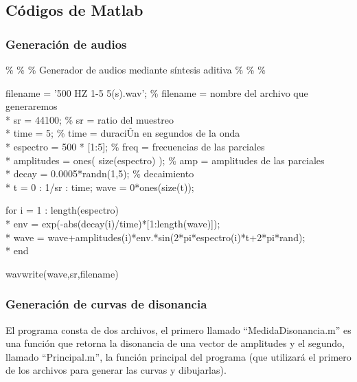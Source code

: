 \documentclass[11pt,a4paper]{article}
\begin{document}
\newpage

\subsection{Códigos de Matlab}

\subsubsection{Generación de audios}

\%                                                         \%
\%      Generador de audios mediante síntesis aditiva      \%
\%                                                         \%


\newparragraph

\noindent filename = '500 HZ 1-5 5(s).wav';     \% filename = nombre del archivo que generaremos\\*
\noindent sr = 44100;                     \% sr = ratio del muestreo\\*
\noindent time = 5;                       \% time = duraciÛn en segundos de la onda\\*
\noindent espectro = 500 * [1:5];             \% freq = frecuencias de las parciales\\*
\noindent amplitudes = ones( size(espectro) );       \% amp = amplitudes de las parciales\\*
\noindent decay = 0.0005*randn(1,5);      \% decaimiento\\*
\noindent t = 0 : 1/sr : time;
\noindent wave = 0*ones(size(t));


\noindent for i = 1 : length(espectro)\\*
\noindent  env = exp(-abs(decay(i)/time)*[1:length(wave)]);\\*
\noindent  wave = wave+amplitudes(i)*env.*sin(2*pi*espectro(i)*t+2*pi*rand);\\*
\noindent end


\noindent wavwrite(wave,sr,filename)

\subsubsection{Generación de curvas de disonancia}

El programa consta de dos archivos, el primero llamado ``MedidaDisonancia.m'' es una función que retorna la disonancia de una vector de amplitudes y el segundo, llamado ``Principal.m'', la función principal del programa (que utilizará el primero de los archivos para generar las curvas y dibujarlas).
\end{document}
